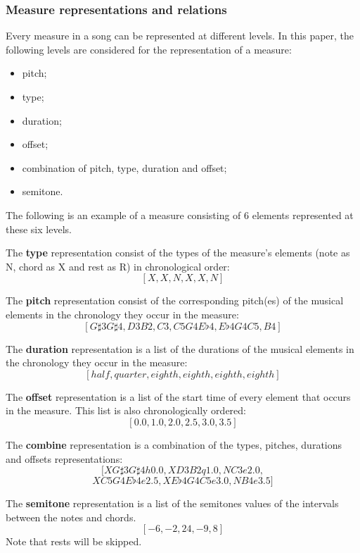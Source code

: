 \subsubsection{Measure representations and relations}
Every measure in a song can be represented at different levels. In this paper, the following levels are considered for the representation of a measure:
\begin{itemize}
	\item pitch;
	\item type;
	\item duration;
	\item offset;
	\item combination of pitch, type, duration and offset;
	\item semitone.
\end{itemize}
The following is an example of a measure consisting of 6 elements represented at these six levels.

The \textbf{type} representation consist of the types of the measure's elements (note as N, chord as X and rest as R) in chronological order:
\[ [X, X, N, X, X, N] \]


The \textbf{pitch} representation consist of the corresponding pitch(es) of the musical elements in the chronology they occur in the measure:
\[[G\sharp3G\sharp4, D3B2, C3, C5G4E\flat4, E\flat4G4C5, B4]\]

The \textbf{duration} representation is a list of the durations of the musical elements in the chronology they occur in the measure:
\[[half, quarter, eighth, eighth, eighth, eighth] \]

The \textbf{offset} representation is a list of the start time of every element that occurs in the measure. This list is also chronologically ordered:
\[[0.0, 1.0, 2.0, 2.5, 3.0, 3.5] \]

The \textbf{combine} representation is a combination of the types, pitches, durations and offsets representations:
\[ [XG\sharp3G\sharp4h0.0, XD3B2q1.0, NC3e2.0, \]
\[XC5G4E\flat4e2.5, XE\flat4G4C5e3.0, NB4e3.5] \]

The \textbf{semitone} representation is a list of the semitones values of the intervals between the notes and chords. 
\[[-6, -2, 24, -9, 8] \]
Note that rests will be skipped.